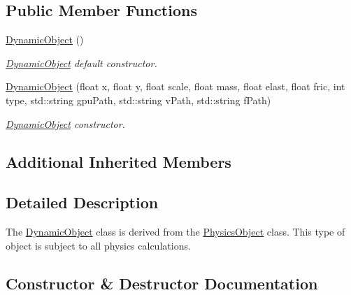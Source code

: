 \subsection*{Public Member Functions}
\begin{DoxyCompactItemize}
\item 
\hyperlink{class_dynamic_object_a50a7adf3d7d1f411ed2aa9a663bfe275}{Dynamic\+Object} ()\hypertarget{class_dynamic_object_a50a7adf3d7d1f411ed2aa9a663bfe275}{}\label{class_dynamic_object_a50a7adf3d7d1f411ed2aa9a663bfe275}

\begin{DoxyCompactList}\small\item\em \hyperlink{class_dynamic_object}{Dynamic\+Object} default constructor. \end{DoxyCompactList}\item 
\hyperlink{class_dynamic_object_abb1aa9bb75f6063779b934e95bec2347}{Dynamic\+Object} (float x, float y, float scale, float mass, float elast, float fric, int type, std\+::string gpu\+Path, std\+::string v\+Path, std\+::string f\+Path)
\begin{DoxyCompactList}\small\item\em \hyperlink{class_dynamic_object}{Dynamic\+Object} constructor. \end{DoxyCompactList}\end{DoxyCompactItemize}
\subsection*{Additional Inherited Members}


\subsection{Detailed Description}
The \hyperlink{class_dynamic_object}{Dynamic\+Object} class is derived from the \hyperlink{class_physics_object}{Physics\+Object} class. This type of object is subject to all physics calculations. 

\subsection{Constructor \& Destructor Documentation}
